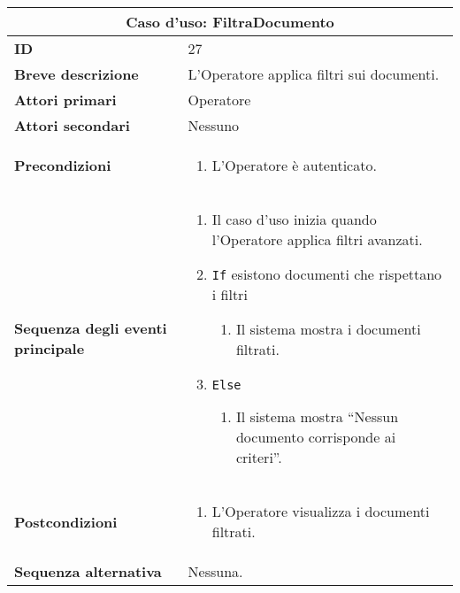 \documentclass[a4paper]{report}
\begin{document}
\clearpage
\begin{table}[H]
\vspace*{-0cm}
\renewcommand{\arraystretch}{1.9}
\begin{tabular}{|p{3.9cm}|p{9.9cm}|}
\hline
\multicolumn{2}{|c|}{\textbf{Caso d’uso: FiltraDocumento}} \\ \hline
	\textbf{ID} & 27 \\ \hline
	\textbf{Breve descrizione} & L’Operatore applica filtri sui documenti. \\ \hline
	\textbf{Attori primari} & Operatore  \\ \hline
	\textbf{Attori secondari} & Nessuno \\ \hline
	\textbf{Precondizioni} & \begin{enumerate}[leftmargin=14pt,label=\arabic*.,labelsep=0.5em,topsep=0pt,partopsep=0pt,parsep=0pt,itemsep=0pt]
        \item L’Operatore è autenticato.
    \end{enumerate} \\ \hline
	\textbf{Sequenza degli eventi principale} & 
\begin{enumerate}[leftmargin=14pt,label=\arabic*.,labelsep=0.5em,topsep=0pt,partopsep=0pt,parsep=0pt,itemsep=0pt]
    \item Il caso d’uso inizia quando l’Operatore applica filtri avanzati.
    \item \texttt{If} esistono documenti che rispettano i filtri
    \begin{enumerate}[label=\arabic{enumi}.\arabic*.,leftmargin=22pt,labelsep=0.5em,topsep=0pt,partopsep=0pt,parsep=0pt,itemsep=0pt]
        \item Il sistema mostra i documenti filtrati.
    \end{enumerate}
    \item \texttt{Else}
    \begin{enumerate}[label=\arabic{enumi}.\arabic*.,leftmargin=22pt,labelsep=0.5em,topsep=0pt,partopsep=0pt,parsep=0pt,itemsep=0pt]
        \item Il sistema mostra “Nessun documento corrisponde ai criteri”.
    \end{enumerate}
\end{enumerate}\\ \hline
	\textbf{Postcondizioni} & \begin{enumerate}[label=\arabic*.,leftmargin=14pt,labelsep=0.5em,topsep=0pt,partopsep=0pt,parsep=0pt,itemsep=0pt]
        \item L’Operatore visualizza i documenti filtrati.
    \end{enumerate} \\ \hline
	\textbf{Sequenza alternativa} & Nessuna. \\ \hline
\end{tabular}
\end{table}
\end{document}
